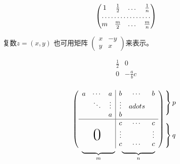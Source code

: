 \documentclass{ctexart}%
\begin{document}
	\[
	\begin{pmatrix}
	1 & \frac 12 & \dots & \frac 1n \\
	\hdotsfor{4} \\
	m & \frac m2 & \dots & \frac mn
	\end{pmatrix}
	\]
	
	复数$z = (x,y)$ 也可用矩阵
	\begin{math}
		\left(  %
		\begin{smallmatrix}
		x & -y \\ y & x
		\end{smallmatrix} %
		\right)
	\end{math}来表示。
	
	
	\[
	\begin{array}{r|r}
	\frac12 & 0 \\
	\hline
	0 & -\frac abc \\
	\end{array}
	\]
	
	
	
	
	\[
	\begin{array}{c@{\hspace{-5pt}}l}
	\left(
	\begin{array}{ccc|ccc}
	a & \cdots & a & b & \cdots & b \\
	& \ddots & \vdots & \vdots & adots \\
	&		 & a & b \\ \hline
	&		 &	 & c & \cdots & c \\
	&		 &	 & \vdots &  & \vdots \\
	\multicolumn{3}{c|}{\raisebox{2ex}[0pt]{\Huge 0}}
	& c & \cdots & c
	\end{array}
	\right)
	& %
	\begin{array}{l}
	\left. \rule{0mm}{7mm}\right\}p\\
	\\
	\left.\rule{0mm}{7mm}\right\}q
	\end{array}
	\\[-5pt]
	\begin{array}{cc}
	\underbrace{\rule{17mm}{0mm}}_m &
	\underbrace{\rule{17mm}{0mm}}_n 
	\end{array}	
	& 
	\end{array}
	\]
	
\end{document}
